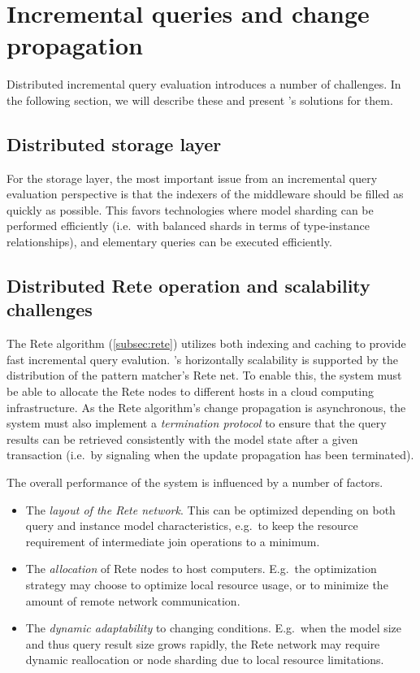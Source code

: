 \section{Incremental queries and change propagation}
\label{sec:incrementality}

Distributed incremental query evaluation introduces a number of challenges. In the following section, we will describe these and present \iqd{}'s solutions for them.

\subsection{Distributed storage layer}

For the storage layer, the most important issue from an incremental query evaluation perspective is that the indexers of the middleware should be filled as quickly as possible. This favors technologies where model sharding can be performed efficiently (i.e.\ with balanced shards in terms of type-instance relationships), and elementary queries 
can be executed efficiently.


\subsection{Distributed Rete operation and scalability challenges}

The Rete algorithm (\autoref{subsec:rete}) utilizes both indexing and caching to provide fast incremental query evalution. \iqd{}'s horizontally scalability is supported by the distribution of the pattern matcher's Rete net. To enable this, the system must be able to allocate the Rete nodes to different hosts in a cloud computing infrastructure. As the Rete algorithm's change propagation is asynchronous, the system must also implement a \emph{termination protocol} to ensure that the query results can be retrieved consistently with the model state after a given transaction (i.e.\ by signaling when the update propagation has been terminated).

The overall performance of the system is influenced by a number of factors.

\begin{itemize}
  \item The \emph{layout of the Rete network}. This can be optimized depending on both query and instance model characteristics, e.g.\ to keep the resource requirement of intermediate join operations to a minimum.
  \item The \emph{allocation} of Rete nodes to host computers. E.g.\ the optimization strategy may choose to optimize local resource usage, or to minimize the amount of remote network communication.
  \item The \emph{dynamic adaptability} to changing conditions. E.g.\ when the model size and thus query result size grows rapidly, the Rete network may require dynamic reallocation or node sharding due to local resource limitations.
\end{itemize}


